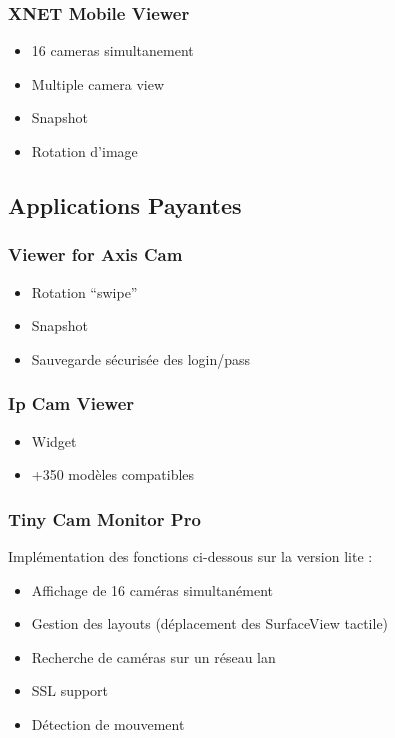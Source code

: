 \subsubsection{XNET Mobile Viewer}
\begin{itemize}
  \item 16 cameras simultanement
  \item Multiple camera view
  \item Snapshot
  \item Rotation d'image
\end{itemize}

\subsection{Applications Payantes}
\subsubsection{Viewer for Axis Cam}
\begin{itemize}
  \item Rotation ``swipe''
  \item Snapshot
  \item Sauvegarde sécurisée des login/pass
\end{itemize}

\subsubsection{Ip Cam Viewer}
\begin{itemize}
  \item Widget
  \item +350 modèles compatibles
\end{itemize}

\subsubsection{Tiny Cam Monitor Pro}
Implémentation des fonctions ci-dessous sur la version lite :
\begin{itemize}
  \item Affichage de 16 caméras simultanément
  \item Gestion des layouts (déplacement des SurfaceView tactile)
  \item Recherche de caméras sur un réseau lan
  \item SSL support
  \item Détection de mouvement
\end{itemize}

